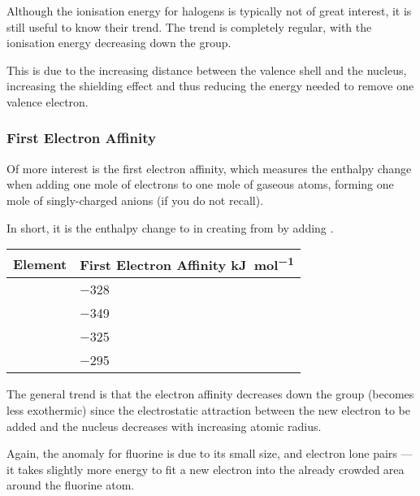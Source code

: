 				Although the ionisation energy for halogens is typically not of great interest, it is still useful to know their trend. The trend
				is completely regular, with the ionisation energy decreasing down the group.

				This is due to the increasing distance between the valence shell and the nucleus, increasing the shielding effect and thus
				reducing the energy needed to remove one valence electron.



			\subsubsection{First Electron Affinity}

				Of more interest is the first electron affinity, which measures the enthalpy change when adding one mole of electrons to one
				mole of gaseous atoms, forming one mole of singly-charged anions (if you do not recall).

				In short, it is the enthalpy change to in creating  from  by adding .

				\begin{center}\begin{table}[htb]\renewcommand{\arraystretch}{1.5}
				\begin{tabu} to \textwidth {X[c,m] | X[c,m]}

					Element		&	First Electron Affinity \si{\kilo\joule\per\mole}	\\	\hline
							&	\num{-328}											\\	\hline
					\ch{\Cl}	&	\num{-349}											\\	\hline
							&	\num{-325}											\\	\hline
							&	\num{-295}											\\	\hline

				\end{tabu}
				\end{table}\end{center}\vspace{-10mm}


				The general trend is that the electron affinity decreases down the group (becomes less exothermic) since the electrostatic
				attraction between the new electron to be added and the nucleus decreases with increasing atomic radius.

				Again, the anomaly for fluorine is due to its small size, and electron lone pairs --- it takes slightly more energy to fit
				a new electron into the already crowded area around the fluorine atom.


